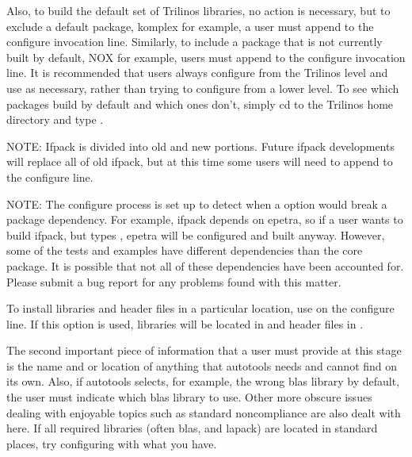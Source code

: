 \documentclass[12pt,relax]{TrilinosDevGuide}
\begin{document}
	Also, to build the default set of Trilinos libraries, no action is 
necessary, but to exclude a default package, komplex for example, a user must 
append  to the configure invocation  line.  
Similarly, to include a package that is not currently built by default, NOX 
for example, users must append  to the configure 
invocation line.  It is recommended that users always configure from the 
Trilinos level and use  as necessary, 
rather than trying to configure from a lower level.  To see which packages 
build by default and which ones don't, simply cd to the Trilinos home 
directory and type .

NOTE: Ifpack is divided into old and new portions.  Future ifpack developments 
will replace all of old ifpack, but at this time some users will need to append
 to the configure line.

NOTE: The configure process is set up to detect when a 
 option would break a package dependency.  
For example, ifpack depends on epetra, so if a user wants to build ifpack, but 
types , epetra will be configured and built 
anyway.  However, some of the tests and examples have different dependencies 
than the core package.  It is possible that not all of these dependencies have 
been accounted for.  Please submit a bug report for any problems found with 
this matter.

	To install libraries and header files in a particular location, 
use  on the configure line.  If this option is 
used, libraries will be located in  and header files in 
.

	The second important piece of information that a user must provide at 
this stage is the name and or location of anything that autotools needs and 
cannot find on its own.  Also, if autotools selects, for example, the wrong 
blas library by default, the user must indicate which blas library to use.  
Other more obscure issues dealing with enjoyable topics such as standard 
noncompliance are also dealt with here.  If all required libraries (often 
blas, and lapack) are located in standard places, try configuring with what 
you have.
\end{document}
